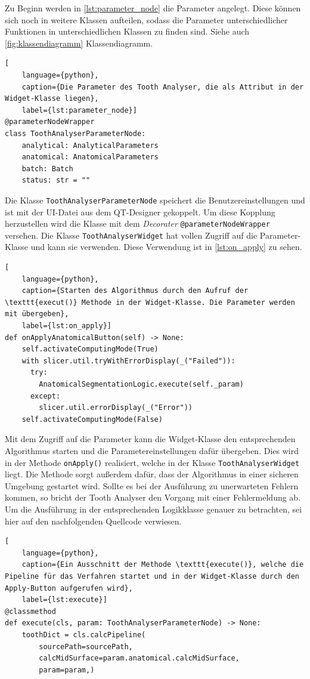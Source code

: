 Zu Beginn werden in \ref{lst:parameter_node} die Parameter angelegt. Diese
können sich noch in weitere Klassen aufteilen, sodass die Parameter unterschiedlicher
Funktionen in unterschiedlichen Klassen zu finden sind. Siehe auch
\ref{fig:klassendiagramm} Klassendiagramm.

\begin{lstlisting}[
    language={python},
    caption={Die Parameter des Tooth Analyser, die als Attribut in der Widget-Klasse liegen},
    label={lst:parameter_node}]
@parameterNodeWrapper
class ToothAnalyserParameterNode:
    analytical: AnalyticalParameters
    anatomical: AnatomicalParameters
    batch: Batch
    status: str = ""
\end{lstlisting}

Die Klasse \texttt{ToothAnalyserParameterNode} speichert die
Benutzereinstellungen und ist mit der \ac{UI}-Datei aus dem QT-Designer gekoppelt.
Um diese Kopplung herzustellen wird die Klasse mit dem \textit{Decorater} \texttt{@parameterNodeWrapper}
versehen. Die Klasse \texttt{ToothAnalyserWidget} hat vollen Zugriff auf die
Parameter-Klasse und kann sie verwenden. Diese Verwendung ist in \ref{lst:on_apply}
zu sehen.

\begin{lstlisting}[
    language={python},
    caption={Starten des Algorithmus durch den Aufruf der \texttt{execut()} Methode in der Widget-Klasse. Die Parameter werden mit übergeben},
    label={lst:on_apply}]
def onApplyAnatomicalButton(self) -> None:
    self.activateComputingMode(True)
    with slicer.util.tryWithErrorDisplay(_("Failed")):
	  try:
	    AnatomicalSegmentationLogic.execute(self._param)
	  except:
	    slicer.util.errorDisplay(_("Error"))
    self.activateComputingMode(False)
\end{lstlisting}

Mit dem Zugriff auf die Parameter kann die Widget-Klasse den entsprechenden
Algorithmus starten und die Parametereinstellungen dafür übergeben. Dies wird in
der Methode \texttt{onApply()} realisiert, welche in der Klasse \texttt{ToothAnalyserWidget}
liegt. Die Methode sorgt außerdem dafür, dass der Algorithmus in einer sicheren
Umgebung gestartet wird. Sollte es bei der Ausführung zu unerwarteten Fehlern kommen,
so bricht der Tooth Analyser den Vorgang mit einer Fehlermeldung ab. Um die Ausführung
in der entsprechenden Logikklasse genauer zu betrachten, sei hier auf den
nachfolgenden Quellcode verwiesen.

\pagebreak

\begin{lstlisting}[
    language={python},
    caption={Ein Ausschnitt der Methode \texttt{execute()}, welche die Pipeline für das Verfahren startet und in der Widget-Klasse durch den Apply-Button aufgerufen wird},
    label={lst:execute}]
@classmethod
def execute(cls, param: ToothAnalyserParameterNode) -> None:
    toothDict = cls.calcPipeline(
	    sourcePath=sourcePath,
	    calcMidSurface=param.anatomical.calcMidSurface,
	    param=param,)
\end{lstlisting}

